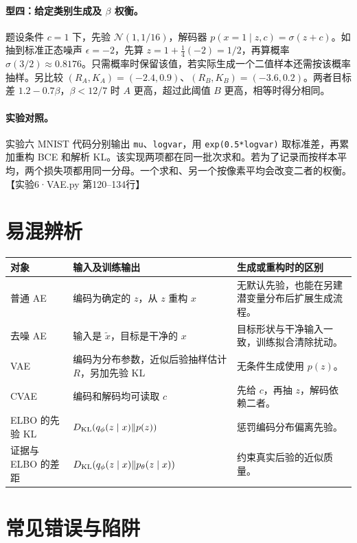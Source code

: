\documentclass[UTF8,a4paper,zihao=-4,fontset=fandol]{ctexrep}
\begin{document}
\paragraph{型四：给定类别生成及 $\beta$ 权衡。}
题设条件 $c=1$ 下，先验 $\mathcal N(1,1/16)$，解码器 $p(x=1\mid z,c)=\sigma(z+c)$。如抽到标准正态噪声 $\epsilon=-2$，先算 $z=1+\frac14(-2)=1/2$，再算概率 $\sigma(3/2)\approx0.8176$。只需概率时保留该值，若实际生成一个二值样本还需按该概率抽样。另比较 $(R_A,K_A)=(-2.4,0.9)$、$(R_B,K_B)=(-3.6,0.2)$。两者目标差 $1.2-0.7\beta$，$\beta<12/7$ 时 $A$ 更高，超过此阈值 $B$ 更高，相等时得分相同。

\paragraph{实验对照。}
实验六 MNIST 代码分别输出 \texttt{mu}、\texttt{logvar}，用 \texttt{exp(0.5*logvar)} 取标准差，再累加重构 BCE 和解析 KL。该实现两项都在同一批次求和。若为了记录而按样本平均，两个损失项都用同一分母。一个求和、另一个按像素平均会改变二者的权衡。【实验6·VAE.py 第120--134行】

\section{易混辨析}

\begin{center}
\begin{tabularx}{\linewidth}{@{}lXX@{}}
\toprule
对象 & 输入及训练输出 & 生成或重构时的区别\\
\midrule
普通 AE & 编码为确定的 $z$，从 $z$ 重构 $x$ & 无默认先验，也能在另建潜变量分布后扩展生成流程。\\
去噪 AE & 输入是 $\widetilde x$，目标是干净的 $x$ & 目标形状与干净输入一致，训练拟合清除扰动。\\
VAE & 编码为分布参数，近似后验抽样估计 $R$，另加先验 KL & 无条件生成使用 $p(z)$。\\
CVAE & 编码和解码均可读取 $c$ & 先给 $c$，再抽 $z$，解码依赖二者。\\
ELBO 的先验 KL & $D_{\rm KL}(q_\phi(z\mid x)\|p(z))$ & 惩罚编码分布偏离先验。\\
证据与 ELBO 的差距 & $D_{\rm KL}(q_\phi(z\mid x)\|p_\theta(z\mid x))$ & 约束真实后验的近似质量。\\
\bottomrule
\end{tabularx}
\end{center}

\section{常见错误与陷阱}
\end{document}
